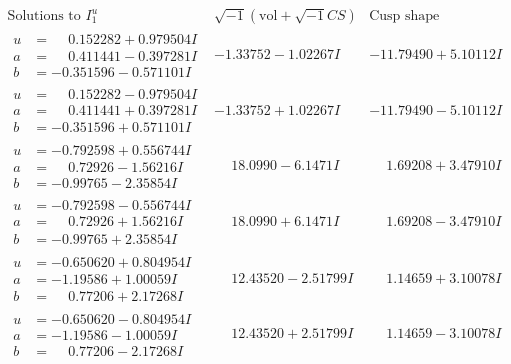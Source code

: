 \documentclass[1p]{elsarticle_modified}
\theoremstyle{definition}
\newcommand{\I}{\sqrt{-1}}
\begin{document}
$$\begin{array}{c|c|c}  
\text{Solutions to }I^u_{1}& \I (\text{vol} + \sqrt{-1}CS) & \text{Cusp shape}\\
 \hline 
\begin{aligned}
u &= \phantom{-}0.152282 + 0.979504 I \\
a &= \phantom{-}0.411441 - 0.397281 I \\
b &= -0.351596 - 0.571101 I\end{aligned}
 & -1.33752 - 1.02267 I & -11.79490 + 5.10112 I \\ \hline\begin{aligned}
u &= \phantom{-}0.152282 - 0.979504 I \\
a &= \phantom{-}0.411441 + 0.397281 I \\
b &= -0.351596 + 0.571101 I\end{aligned}
 & -1.33752 + 1.02267 I & -11.79490 - 5.10112 I \\ \hline\begin{aligned}
u &= -0.792598 + 0.556744 I \\
a &= \phantom{-}0.72926 - 1.56216 I \\
b &= -0.99765 - 2.35854 I\end{aligned}
 & \phantom{-}18.0990 - 6.1471 I & \phantom{-}1.69208 + 3.47910 I \\ \hline\begin{aligned}
u &= -0.792598 - 0.556744 I \\
a &= \phantom{-}0.72926 + 1.56216 I \\
b &= -0.99765 + 2.35854 I\end{aligned}
 & \phantom{-}18.0990 + 6.1471 I & \phantom{-}1.69208 - 3.47910 I \\ \hline\begin{aligned}
u &= -0.650620 + 0.804954 I \\
a &= -1.19586 + 1.00059 I \\
b &= \phantom{-}0.77206 + 2.17268 I\end{aligned}
 & \phantom{-}12.43520 - 2.51799 I & \phantom{-}1.14659 + 3.10078 I \\ \hline\begin{aligned}
u &= -0.650620 - 0.804954 I \\
a &= -1.19586 - 1.00059 I \\
b &= \phantom{-}0.77206 - 2.17268 I\end{aligned}
 & \phantom{-}12.43520 + 2.51799 I & \phantom{-}1.14659 - 3.10078 I \\ \hline\begin{aligned}

\end{aligned}
\end{array}$$
\end{document}
